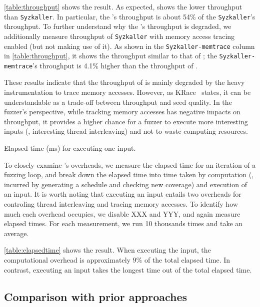 \autoref{table:throughput} shows the result. As expected, \sys shows
the lower throughput than \texttt{Syzkaller}. In particular, the
\sys's throughput is about 54\% of the \texttt{Syzkaller}'s
throughput.
%
To further understand why the \sys's throughput is degraded, we
additionally measure throughput of \texttt{Syzkaller} with memory
access tracing enabled (but not making use of it).
%
As shown in the \texttt{Syzkaller-memtrace} column in
\autoref{table:throughput}, it shows the throughput similar to that of
\sys; the \texttt{Syzkaller-memtrace}'s throughput is 4.1\% higher
than the throughput of \sys.

These results indicate that the throughput of \sys is mainly degraded
by the heavy instrumentation to trace memory accesses.
%
However, as KRace~\cite{krace} states, it can be understandable as a
trade-off between throughput and seed quality.
%
In the fuzzer's perspective, while tracking memory accesses has
negative impacts on throughput, it provides a higher chance for a
fuzzer to execute more interesting inputs (\ie, interesting thread
interleaving) and not to waste computing resources.




%
\begin{table}[t]
  \centering
  
  \caption{ Elapsed time (ms) for executing one input.}
  \label{table:elapsedtime}
\end{table}
%
%
To closely examine \sys's overheads, we measure the elapsed time for
an iteration of a fuzzing loop, and break down the elapsed time into
time taken by computation (\ie, incurred by generating a schedule and
checking new coverage) and execution of an input.
%
It is worth noting that executing an input entails two overheads for
controling thread interleaving and tracing memory accesses. To
identify how much each overhead occupies, we disable XXX and YYY, and
again measure elapsed times.
%
For each measurement, we run 10 thousands times and take an average.

\autoref{table:elapsedtime} shows the result. When executing the
input, the computational overhead is approximately 9\% of the total
elapsed time. In contrast, executing an input takes the longest time
out of the total elapsed time.



\subsection{Comparison with prior approaches}
\label{ss:comparison}

